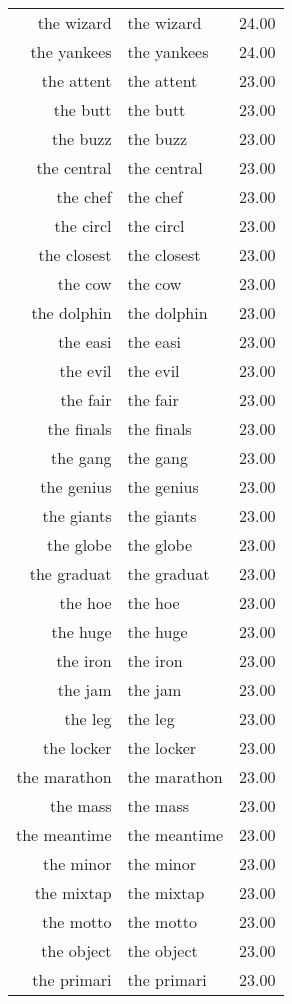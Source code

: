 \begin{table}[ht]
\begin{tabular}{rlr}
  the wizard & the wizard & 24.00 \\ 
  the yankees & the yankees & 24.00 \\ 
  the attent & the attent & 23.00 \\ 
  the butt & the butt & 23.00 \\ 
  the buzz & the buzz & 23.00 \\ 
  the central & the central & 23.00 \\ 
  the chef & the chef & 23.00 \\ 
  the circl & the circl & 23.00 \\ 
  the closest & the closest & 23.00 \\ 
  the cow & the cow & 23.00 \\ 
  the dolphin & the dolphin & 23.00 \\ 
  the easi & the easi & 23.00 \\ 
  the evil & the evil & 23.00 \\ 
  the fair & the fair & 23.00 \\ 
  the finals & the finals & 23.00 \\ 
  the gang & the gang & 23.00 \\ 
  the genius & the genius & 23.00 \\ 
  the giants & the giants & 23.00 \\ 
  the globe & the globe & 23.00 \\ 
  the graduat & the graduat & 23.00 \\ 
  the hoe & the hoe & 23.00 \\ 
  the huge & the huge & 23.00 \\ 
  the iron & the iron & 23.00 \\ 
  the jam & the jam & 23.00 \\ 
  the leg & the leg & 23.00 \\ 
  the locker & the locker & 23.00 \\ 
  the marathon & the marathon & 23.00 \\ 
  the mass & the mass & 23.00 \\ 
  the meantime & the meantime & 23.00 \\ 
  the minor & the minor & 23.00 \\ 
  the mixtap & the mixtap & 23.00 \\ 
  the motto & the motto & 23.00 \\ 
  the object & the object & 23.00 \\ 
  the primari & the primari & 23.00 \\ 

\end{tabular}
\end{table}
